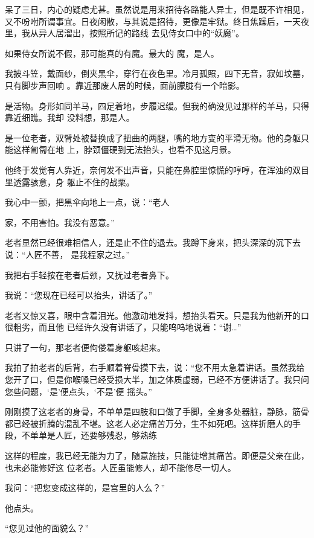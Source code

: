 \documentclass{article}
\begin{document}
呆了三日，内心的疑虑尤甚。虽然说是用来招待各路能人异士，但是既不许相见，又不吩咐所谓事宜。日夜闲散，与其说是招待，更像是牢狱。终日焦躁后，一天夜里，我从异人居溜出，按照所记的路线
去见侍女口中的“妖魔”。 

\newpage

如果侍女所说不假，那可能真的有魔。最大的
魔，是人。 

我披斗笠，戴面纱，倒夹黑伞，穿行在夜色里。冷月孤照，四下无音，寂如坟墓，只有脚步声回响
。靠近那废人居的时候，面前朦胧有一个暗影。 

是活物。身形如同羊马，四足着地，步履迟缓。但我的确没见过那样的羊马，只得靠近细瞧。我却
没料想，那是人。 

是一位老者，双臂处被替换成了扭曲的两腿，嘴的地方变的平滑无物。他的身躯只能这样匍匐在地
上，脖颈僵硬到无法抬头，也看不见这月景。 

他终于发觉有人靠近，奈何发不出声音，只能在鼻腔里惊慌的哼哼，在浑浊的双目里透露骇意，身
躯止不住的战栗。 

我心中一颤，把黑伞向地上一点，说：“老人

\newpage
家，不用害怕。我没有恶意。” 

老者显然已经很难相信人，还是止不住的退去。我蹲下身来，把头深深的沉下去说：“人匠不善，
是我程家之过。” 

我把右手轻按在老者后颈，又抚过老者鼻下。


我说：“您现在已经可以抬头，讲话了。” 

老者又惊又喜，眼中含着泪光。他激动地发抖，想抬头看天。只是我为他新开的口很粗劣，而且他
已经许久没有讲话了，只能呜呜地说着：“谢…” 


只讲了一句，那老者便佝偻着身躯咳起来。 

我拍了拍老者的后背，右手顺着脊骨摸下去，说：“您不用太急着讲话。虽然我给您开了口，但是你喉嗓已经受损大半，加之体质虚弱，已经不方便讲话了。我只问您些问题，‘是’便点头，‘不是’便
摇头。” 

\newpage

刚刚摸了这老者的身骨，不单单是四肢和口做了手脚，全身多处器脏，静脉，筋骨都已经被折腾的混乱不堪。这老人必定痛苦万分，生不如死吧。这样折磨人的手段，不单单是人匠，还要够残忍，够熟练

这样的程度，我已经无能为力了，随意施技，只能徒增其痛苦。即便是父亲在此，也未必能修好这
位老者。人匠虽能修人，却不能修尽一切人。 

我问：“把您变成这样的，是宫里的人么？”


他点头。 


“您见过他的面貌么？” 
\end{document}
